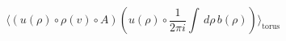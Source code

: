 \begin{equation}\label{eq:TorusCorr}
  \langle ( u (\rho) \circ \rho(v) \circ A) 
( u(\rho)\circ  \frac{1}{2 \pi i}\int\, d\rho\, b(\rho)) \rangle_{\text{torus}}
\end{equation}

